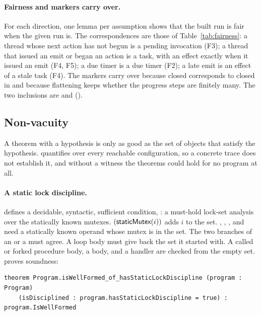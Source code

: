 \paragraph{Fairness and markers carry over.}
For each direction, one lemma per assumption shows that the built run is
fair when the given run is. The correspondences are those of
Table~\ref{tab:fairness}: a thread whose next action has not begun is a
pending invocation (F3); a thread that issued an emit or began an action is
a task, with an effect exactly when it issued an emit (F4, F5); a due timer
is a due timer (F2); a late emit is an effect of a stale task (F4). The
markers carry over because closed corresponds to closed in 
and because flattening keeps whether the progress steps are finitely many.
The two inclusions are  and
 ().

\subsection{Non-vacuity}
\label{sec:nonvacuity}

A theorem with a hypothesis is only as good as the set of objects that
satisfy the hypothesis.  quantifies over every
reachable configuration, so a concrete trace does not establish it, and
without a witness the theorems could hold for no program at all.

\paragraph{A static lock discipline.}
 defines a decidable, syntactic, sufficient
condition, : a must-hold lock-set
analysis over the statically known mutexes.
$(\textsf{staticMutex}(i))$ adds $i$ to the set. ,
, , and  need a statically known operand
whose mutex is in the set. The two branches of an  or a 
must agree. A loop body must give back the set it started with. A called or
forked procedure body, a  body, and a handler are checked from the
empty set.  proves soundness:

\begin{Verbatim}
theorem Program.isWellFormed_of_hasStaticLockDiscipline (program : Program)
    (isDisciplined : program.hasStaticLockDiscipline = true) : program.IsWellFormed
\end{Verbatim}

